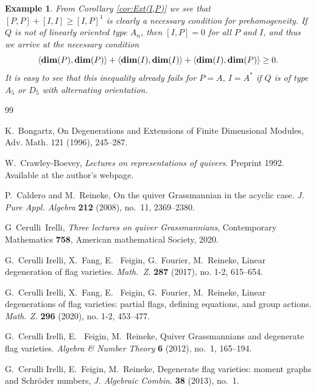 \documentclass{amsart}
\newtheorem{example}[theorem]{Example}
\numberwithin{equation}{section}
\theoremstyle{remark}
\begin{document}
\begin{example} From Corollary \ref{cor:Ext(I,P)} we see that $[P,P]+[I,I]\geq [I,P]^1$ is clearly a necessary condition for prehomogeneity. If $Q$ is not of linearly oriented type $A_n$, then $[I,P]=0$ for all $P$ and $I$, and thus we arrive at the necessary condition 
\[
\langle{\rm\bf dim}(P),{\rm\bf dim}(P)\rangle+\langle{\rm\bf dim} (I),{\rm\bf dim}(I)\rangle+\langle{\rm\bf dim}(I),{\rm\bf dim} (P)\rangle\geq 0.
\]
It is easy to see that this inequality already fails for $P=A$, $I=A^*$ if $Q$ is of type $A_5$ or $D_5$ with alternating orientation.
\end{example}



\begin{thebibliography}{99}

K.~Bongartz, On Degenerations and Extensions of Finite Dimensional Modules, Adv. Math.
121 (1996), 245–287.


 W.~Crawley-Boevey, \emph{Lectures on representations of quivers}. Preprint 1992. Available at the author's webpage. 


P.~Caldero and M.~Reineke, On the quiver {G}rassmannian in the acyclic
case. \emph{J. Pure Appl. Algebra} \textbf{212} (2008), no.~11, 2369--2380.

G~Cerulli~Irelli, \emph{Three lectures on quiver Grassmannians}, Contemporary Mathematics \textbf{758}, American mathematical Society, 2020.



G.~Cerulli Irelli, X.~Fang, E.~ Feigin, G.~Fourier, M.~Reineke, Linear degeneration of flag varieties. \emph{Math.~Z.} \textbf{287} (2017), no. 1-2, 615--654. 

G.~Cerulli Irelli, X.~Fang, E.~ Feigin, G.~Fourier, M.~Reineke, 
Linear degenerations of flag varieties: partial flags, defining equations, and group actions. 
\emph{Math. Z.} \textbf{296} (2020), no. 1-2, 453--477.

 G.~Cerulli Irelli, E.~ Feigin, M.~Reineke, Quiver Grassmannians and degenerate flag varieties. 
\emph{Algebra \& Number Theory} \textbf{6} (2012), no.~1, 165--194. 

 G.~Cerulli Irelli, E.~Feigin, M.~Reineke, Degenerate flag varieties: moment graphs 
and Schr\"oder numbers, \emph{J. Algebraic Combin.} \textbf{38} (2013), no.~1.



\end{thebibliography}
\end{document}
